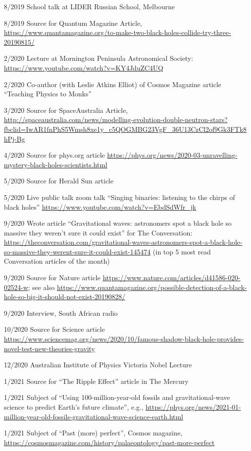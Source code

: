 \documentclass[margin,line]{res}
\begin{document}
\begin{resume}
8/2019	School talk at LIDER Russian School, Melbourne

8/2019 	Source for Quantum Magazine Article, \url{https://www.quantamagazine.org/to-make-two-black-holes-collide-try-three-20190815/}

2/2020	Lecture at Mornington Peninsula Astronomical Society: \url{https://www.youtube.com/watch?v=KY4JduZC4UQ}

2/2020	Co-author (with Leslie Atkins Elliot) of Cosmos Magazine article ``Teaching Physics to Monks''
	
3/2020 	Source for SpaceAustralia Article, \url{http://spaceaustralia.com/news/modelling-evolution-double-neutron-stars?fbclid=IwAR1fnPhS5Wmsh8xe1y_c5QOGMBG23VgF_36U13CzCl2of9Gk3FTk8hPj-Bg}
	  
4/2020	Source for phys.org article \url{https://phys.org/news/2020-03-unravelling-mystery-black-holes-scientists.html}

5/2020	Source for Herald Sun article

5/2020	Live public talk zoom talk ``Singing binaries: listening to the chirps of black holes'' \url{https://www.youtube.com/watch?v=EbdSdWfr_jk}

9/2020	Wrote article ``Gravitational waves: astronomers spot a black hole so massive they weren't sure it could exist'' for The Conversation: \url{https://theconversation.com/gravitational-waves-astronomers-spot-a-black-hole-so-massive-they-werent-sure-it-could-exist-145474} (in top 5 most read Conversation articles of the month)

9/2020	Source for Nature article \url{https://www.nature.com/articles/d41586-020-02524-w}; see also \url{https://www.quantamagazine.org/possible-detection-of-a-black-hole-so-big-it-should-not-exist-20190828/}

9/2020	Interview, South African radio

10/2020	Source for Science article \url{https://www.sciencemag.org/news/2020/10/famous-shadow-black-hole-provides-novel-test-new-theories-gravity}
	  
12/2020	Australian Institute of Physics Victoria Nobel Lecture

1/2021	Source for ``The Ripple Effect'' article in The Mercury

1/2021 	Subject of ``Using 100-million-year-old fossils and gravitational-wave science to predict Earth's future climate'', e.g., \url{https://phys.org/news/2021-01-million-year-old-fossils-gravitational-wave-science-earth.html}

1/2021	Subject of ``Past (more) perfect'', Cosmos magazine, \url{https://cosmosmagazine.com/history/palaeontology/past-more-perfect}


\end{resume}
\end{document}
